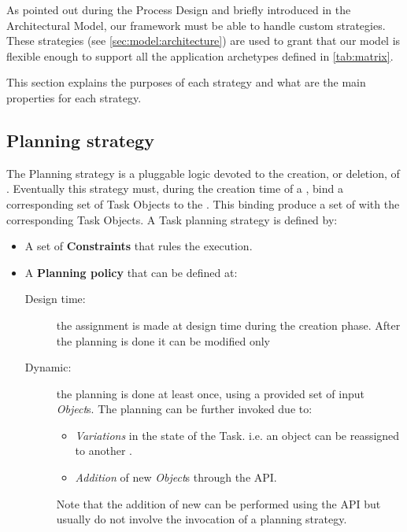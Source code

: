 
As pointed out during the Process Design and briefly introduced in the 
Architectural Model, our framework must be able to handle custom strategies.
These strategies (see \ref{sec:model:architecture}) are used to grant that
our model is flexible enough to support all the application archetypes
defined in \autoref{tab:matrix}.

This section explains the purposes of each strategy and what are the
main properties for each strategy.


\subsection{\utask{} Planning strategy}
The \utask{} Planning strategy is a pluggable logic devoted to the creation, or
deletion, of \utask{}. Eventually this strategy must, during the creation
time of a \utask{}, bind a corresponding set of Task Objects to the \utask{}.
This binding produce a set of \utask{} with the corresponding Task Objects. A
Task planning strategy is defined by:
\begin{itemize}
    \item A set of \textbf{Constraints} that rules the execution.

    \item A \textbf{Planning policy} that can be defined at:
        \begin{description}
            \item[Design time:] the assignment is made at design time during the
            creation phase. After the planning is done it can be modified only

            \item[Dynamic:] the planning is done at least once, using a provided
            set of input \emph{Object}s. The planning can be further invoked due
            to:
            \begin{itemize}
                \item \emph{Variations} in the state of the Task. i.e. an object
                can be reassigned to another \utask{}.

                \item \emph{Addition} of new \emph{Object}s through the API.
            \end{itemize}
            Note that the addition of new \utask{} can be performed using the
            API but usually do not involve the invocation of a \utask{} planning
            strategy.
        \end{description}
\end{itemize}



